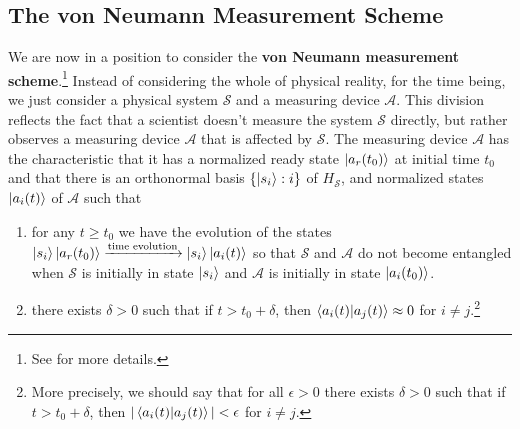     
    \subsection{The von Neumann Measurement Scheme}\label{vonNeumannMeasurement}
    \addtocounter{footnote}{-1}
    \addtocounter{footnote}{1}
    
    We are now in a position to consider the \textbf{von Neumann measurement scheme}.\footnote{See \cite[50-53]{Schlosshauer} for more details.} Instead of considering the whole of physical reality, for the time being, we just consider a physical system $\mathcal{S}$ and a measuring device $\mathcal{A}$. This division reflects the fact that a scientist doesn't measure the system $\mathcal{S}$ directly, but rather observes a measuring device $\mathcal{A}$ that is affected by $\mathcal{S}$. The measuring device $\mathcal{A}$ has the characteristic that it has a normalized ready state $\ket{a_r(t_0)}$ at initial time $t_0$ and that there is an orthonormal basis $\{\ket{s_i}:i\}$ of $H_\mathcal{S}$, and normalized states $\ket{a_i(t)}$ of $\mathcal{A}$ such that
    \begin{enumerate}[noitemsep, nosep, topsep=0pt] 
    \item for any $t\geq t_0$ we have the evolution of the states \label{vonNeumannMeasurement1}
    $\ket{s_i}\ket{a_r(t_0)}\xrightarrow{\text{time evolution}}\ket{s_i}\ket{a_i(t)}$ so that $\mathcal{S}$ and $\mathcal{A}$ do not become entangled when $\mathcal{S}$ is initially in state $\ket{s_i}$ and $\mathcal{A}$ is initially in state $\ket{a_i(t_0)}$.
    \item \label{vonNeumannMeasurement2} there exists $\delta>0$ such that if $t> t_0+\delta$, then $\ip{a_i(t)}{a_j(t)}\approx 0$ for $i\neq j$.\footnote{\label{approx}More precisely, we should say that for all $\epsilon >0$ there exists $\delta>0$ such that if $t> t_0+\delta$, then $|\ip{a_i(t)}{a_j(t)}|<\epsilon$ for $i\neq j$.}
    \end{enumerate}
